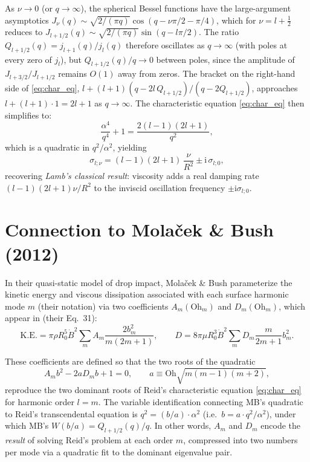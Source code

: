 \documentclass[12pt]{article}
\newcommand{\ii}{\mathrm{i}}
\theoremstyle{definition}
\begin{document}
As $\nu \to 0$ (or $q \to \infty$), the spherical Bessel functions have the large-argument
asymptotics $J_\nu(q) \sim \sqrt{2/(\pi q)}\cos(q - \nu\pi/2 - \pi/4)$, which for
$\nu = l+\tfrac{1}{2}$ reduces to $J_{l+1/2}(q) \sim \sqrt{2/(\pi q)}\sin(q - l\pi/2)$.
The ratio $Q_{l+1/2}(q) = j_{l+1}(q)/j_l(q)$ therefore oscillates as $q\to\infty$
(with poles at every zero of $j_l$), but $Q_{l+1/2}(q)/q \to 0$ between poles,
since the amplitude of $J_{l+3/2}/J_{l+1/2}$ remains $O(1)$ away from zeros.
The bracket on the right-hand side of \eqref{eq:char_eq},
$l + (l+1)(q - 2l\,Q_{l+1/2})/(q - 2Q_{l+1/2})$, approaches $l + (l+1)\cdot 1 = 2l+1$
as $q\to\infty$. The characteristic equation \eqref{eq:char_eq} then simplifies to:
\[
  \frac{\alpha^4}{q^4} + 1 = \frac{2(l-1)(2l+1)}{q^2},
\]
which is a quadratic in $q^2/\alpha^2$, yielding
\begin{equation}
  \sigma_{l;\nu} = (l-1)(2l+1)\,\frac{\nu}{R^2} \pm \ii\,\sigma_{l;0},
  \label{eq:lamb}
\end{equation}
recovering \emph{Lamb's classical result}: viscosity adds a real damping rate
$(l-1)(2l+1)\nu/R^2$ to the inviscid oscillation frequency $\pm\ii\sigma_{l;0}$.

\section{Connection to Mola\v{c}ek \& Bush (2012)}

In their quasi-static model of drop impact, Mola\v{c}ek \& Bush parameterize the
kinetic energy and viscous dissipation associated with each surface harmonic mode $m$
(their notation) via two coefficients $A_m(\mathrm{Oh}_m)$ and $D_m(\mathrm{Oh}_m)$,
which appear in (their Eq.~31):
\[
  \mathrm{K.E.} = \pi\rho R_0^5 \dot{B}^2 \sum_m A_m \frac{2b_m^2}{m(2m+1)},
  \qquad
  D = 8\pi\mu R_0^3 \dot{B}^2 \sum_m D_m \frac{m}{2m+1}b_m^2.
\]

These coefficients are defined so that the two roots of the quadratic
\begin{equation}
  A_m b^2 - 2a D_m b + 1 = 0, \qquad a \equiv \mathrm{Oh}\sqrt{m(m-1)(m+2)},
\end{equation}
reproduce the two dominant roots of Reid's characteristic equation \eqref{eq:char_eq}
for harmonic order $l=m$. The variable identification connecting MB's quadratic to Reid's
transcendental equation is $q^2 = (b/a)\cdot\alpha^2$ (i.e.\ $b = a\cdot q^2/\alpha^2$),
under which MB's $W(b/a) = Q_{l+1/2}(q)/q$. In other words, $A_m$ and $D_m$ encode the
\emph{result} of solving Reid's problem at each order $m$, compressed into two numbers
per mode via a quadratic fit to the dominant eigenvalue pair.
\end{document}
